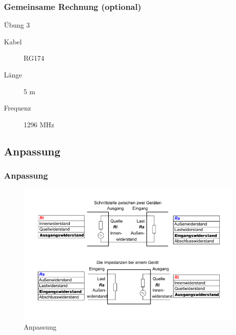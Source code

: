 \begin{frame}
\frametitle{Gemeinsame Rechnung (optional)}
\begin{exampleblock}{Übung 3}
  \begin{description}
 	\item[Kabel] RG174
 	\item[Länge] 5 m
 	\item[Frequenz] 1296 MHz
  \end{description}
\end{exampleblock}
\end{frame}


\subsection*{Anpassung}
\begin{frame}
\frametitle{Anpassung}
\begin{center}
\begin{figure}
\includegraphics[width=1\textwidth,height=.7\textheight,keepaspectratio]{e10/Anpassung.png}
\caption{Anpassung\cite{anpassung}}
\end{figure}
\end{center}
\end{frame}

